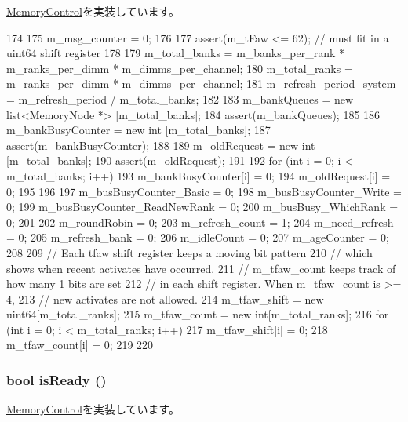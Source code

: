 \hyperlink{classMemoryControl_ab5be7e5a13ea77d59aac45d21dceb6a0}{MemoryControl}を実装しています。


\begin{DoxyCode}
174 {
175     m_msg_counter = 0;
176 
177     assert(m_tFaw <= 62); // must fit in a uint64 shift register
178 
179     m_total_banks = m_banks_per_rank * m_ranks_per_dimm * m_dimms_per_channel;
180     m_total_ranks = m_ranks_per_dimm * m_dimms_per_channel;
181     m_refresh_period_system = m_refresh_period / m_total_banks;
182 
183     m_bankQueues = new list<MemoryNode *> [m_total_banks];
184     assert(m_bankQueues);
185 
186     m_bankBusyCounter = new int [m_total_banks];
187     assert(m_bankBusyCounter);
188 
189     m_oldRequest = new int [m_total_banks];
190     assert(m_oldRequest);
191 
192     for (int i = 0; i < m_total_banks; i++) {
193         m_bankBusyCounter[i] = 0;
194         m_oldRequest[i] = 0;
195     }
196 
197     m_busBusyCounter_Basic = 0;
198     m_busBusyCounter_Write = 0;
199     m_busBusyCounter_ReadNewRank = 0;
200     m_busBusy_WhichRank = 0;
201 
202     m_roundRobin = 0;
203     m_refresh_count = 1;
204     m_need_refresh = 0;
205     m_refresh_bank = 0;
206     m_idleCount = 0;
207     m_ageCounter = 0;
208 
209     // Each tfaw shift register keeps a moving bit pattern
210     // which shows when recent activates have occurred.
211     // m_tfaw_count keeps track of how many 1 bits are set
212     // in each shift register.  When m_tfaw_count is >= 4,
213     // new activates are not allowed.
214     m_tfaw_shift = new uint64[m_total_ranks];
215     m_tfaw_count = new int[m_total_ranks];
216     for (int i = 0; i < m_total_ranks; i++) {
217         m_tfaw_shift[i] = 0;
218         m_tfaw_count[i] = 0;
219     }
220 }
\end{DoxyCode}
\hypertarget{classRubyMemoryControl_acbed040576a7a18e2d9c46b2f15e0162}{
\subsubsection[{isReady}]{\setlength{\rightskip}{0pt plus 5cm}bool isReady ()}}
\label{classRubyMemoryControl_acbed040576a7a18e2d9c46b2f15e0162}


\hyperlink{classMemoryControl_a90b7287ef3808f6b4b355495d24a9b38}{MemoryControl}を実装しています。


